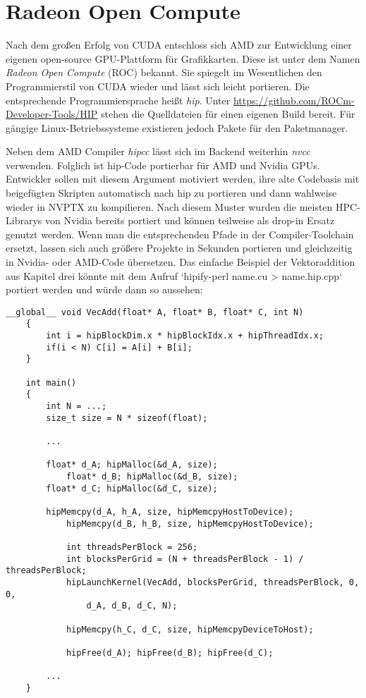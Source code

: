	\chapter{Radeon Open Compute}
	Nach dem großen Erfolg von CUDA entschloss sich AMD zur Entwicklung einer eigenen open-source GPU-Plattform für Grafikkarten. Diese ist unter dem Namen \textit{Radeon Open Compute} (ROC) bekannt. Sie spiegelt im Wesentlichen den Programmierstil von CUDA wieder und lässt sich leicht portieren. Die entsprechende Programmiersprache heißt \textit{hip}. Unter \href{https://github.com/ROCm-Developer-Tools/HIP}{\small https://github.com/ROCm-Developer-Tools/HIP} stehen die Quelldateien für einen eigenen Build bereit. Für gängige Linux-Betriebssysteme existieren jedoch Pakete für den Paketmanager.
	
	Neben dem AMD Compiler \textit{hipcc} lässt sich im Backend weiterhin \textit{nvcc} verwenden. Folglich ist hip-Code portierbar für AMD und Nvidia GPUs. Entwickler sollen mit diesem Argument motiviert werden, ihre alte Codebasis mit beigefügten Skripten automatisch nach hip zu portieren und dann wahlweise wieder in \Gls{NVPTX} zu kompilieren. Nach diesem Muster wurden die meisten HPC-Librarys von Nvidia bereits portiert und können teilweise als drop-in Ersatz genutzt werden. Wenn man die entsprechenden Pfade in der Compiler-Toolchain ersetzt, lassen sich auch größere Projekte in Sekunden portieren und gleichzeitig in Nvidia- oder AMD-Code übersetzen. Das einfache Beispiel der Vektoraddition aus Kapitel drei könnte mit dem Aufruf \li`hipify-perl name.cu > name.hip.cpp` portiert werden und würde dann so aussehen:
	
	\begin{lstlisting}[caption=Radeon Open Compute]
	__global__ void VecAdd(float* A, float* B, float* C, int N)
	{
        int i = hipBlockDim.x * hipBlockIdx.x + hipThreadIdx.x;
        if(i < N) C[i] = A[i] + B[i];
	}
            
	int main()
	{
        int N = ...;
	    size_t size = N * sizeof(float);
		
		...
		
	    float* d_A; hipMalloc(&d_A, size);
    	    float* d_B; hipMalloc(&d_B, size);
	    float* d_C; hipMalloc(&d_C, size);

	    hipMemcpy(d_A, h_A, size, hipMemcpyHostToDevice);
    	    hipMemcpy(d_B, h_B, size, hipMemcpyHostToDevice);

    	    int threadsPerBlock = 256;
    	    int blocksPerGrid = (N + threadsPerBlock - 1) / threadsPerBlock;
        	hipLaunchKernel(VecAdd, blocksPerGrid, threadsPerBlock, 0, 0, 
    		    d_A, d_B, d_C, N);

    	    hipMemcpy(h_C, d_C, size, hipMemcpyDeviceToHost);
   
    	    hipFree(d_A); hipFree(d_B); hipFree(d_C);

		...
	}
	\end{lstlisting}
	
